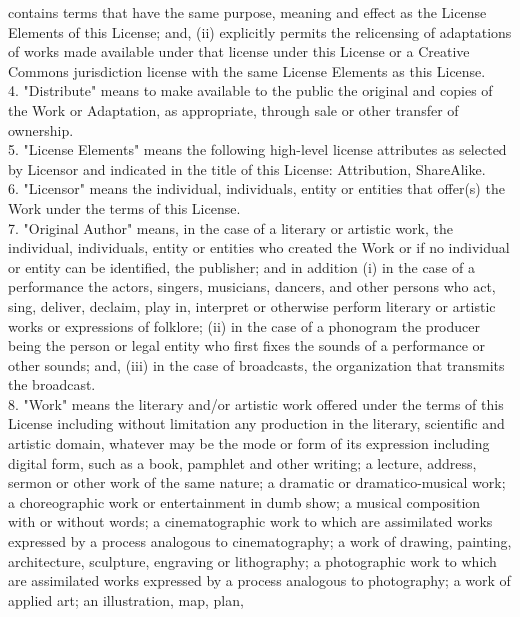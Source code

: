 {   contains terms that have the same purpose, meaning and effect as
   the License Elements of this License; and, (ii) explicitly permits
   the relicensing of adaptations of works made available under that
   license under this License or a Creative Commons jurisdiction
   license with the same License Elements as this License.
\\[4pt]
   4. "Distribute" means to make available to the public the original
   and copies of the Work or Adaptation, as appropriate, through sale
   or other transfer of ownership.
\\[4pt]
   5. "License Elements" means the following high-level license
   attributes as selected by Licensor and indicated in the title of
   this License: Attribution, ShareAlike.
\\[4pt]
   6. "Licensor" means the individual, individuals, entity or entities
   that offer(s) the Work under the terms of this License.
\\[4pt]
   7. "Original Author" means, in the case of a literary or artistic
   work, the individual, individuals, entity or entities who created
   the Work or if no individual or entity can be identified, the
   publisher; and in addition (i) in the case of a performance the
   actors, singers, musicians, dancers, and other persons who act,
   sing, deliver, declaim, play in, interpret or otherwise perform
   literary or artistic works or expressions of folklore; (ii) in the
   case of a phonogram the producer being the person or legal entity
   who first fixes the sounds of a performance or other sounds; and,
   (iii) in the case of broadcasts, the organization that transmits
   the broadcast.
\\[4pt]
   8. "Work" means the literary and/or artistic work offered under the
   terms of this License including without limitation any production
   in the literary, scientific and artistic domain, whatever may be
   the mode or form of its expression including digital form, such as
   a book, pamphlet and other writing; a lecture, address, sermon or
   other work of the same nature; a dramatic or dramatico-musical
   work; a choreographic work or entertainment in dumb show; a musical
   composition with or without words; a cinematographic work to which
   are assimilated works expressed by a process analogous to
   cinematography; a work of drawing, painting, architecture,
   sculpture, engraving or lithography; a photographic work to which
   are assimilated works expressed by a process analogous to
   photography; a work of applied art; an illustration, map, plan,
}
